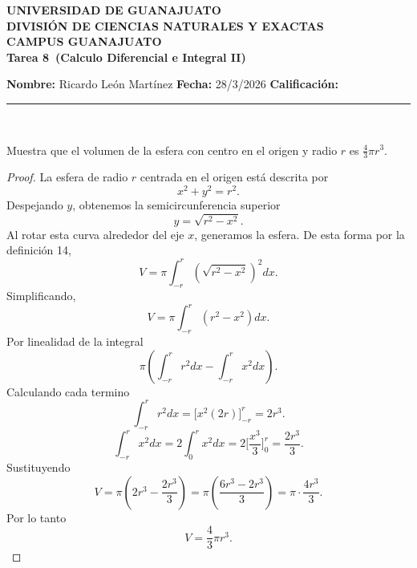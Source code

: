 \documentclass[12pt,a4paper]{article}
\newcommand{\paren}[1]{\left( #1 \right)}
\newcommand{\alumno}{Ricardo León Martínez}
\newcommand{\materia}{Calculo Diferencial e Integral II}
\newcommand{\tarea}{Tarea 8}
\newcommand{\fecha}{28/3/2026}
\begin{document}
    \begin{center}
    {\large\textbf{UNIVERSIDAD DE GUANAJUATO}}\\[0.3cm]
    {\normalsize\textbf{DIVISIÓN DE CIENCIAS NATURALES Y EXACTAS}}\\
    {\normalsize\textbf{CAMPUS GUANAJUATO}}\\[1cm]

    {\Large\textbf{\tarea\ (\materia)}}\\[1cm]
    \end{center}

    \textbf{Nombre:} \alumno \hfill 
    \textbf{Fecha:} \fecha \hfill 
    \textbf{Calificación:} \rule{3cm}{0.4pt} \\[0.3cm]

    \begin{mdframed}[style=mdbluebox,frametitle={Ejercicio 1}]
        Muestra que el volumen de la esfera con centro en el origen y radio $r$ es $\frac43\pi r^{3}$.
    \end{mdframed}

    \begin{proof}
        La esfera de radio $r$ centrada en el origen está descrita por
        \begin{equation*}
            x^{2}+y^{2}=r^{2}.
        \end{equation*}
        Despejando $y$, obtenemos la semicircunferencia superior
        \begin{equation*}
            y=\sqrt{r^{2}-x^{2}}.
        \end{equation*}
        Al rotar esta curva alrededor del eje $x$, generamos la esfera. De esta forma por la definición 14,
        \begin{equation*}
            V=\pi\int_{-r}^{r}\paren{\sqrt{r^{2}-x^{2}}}^{2}dx.
        \end{equation*}
        Simplificando,
        \begin{equation*}
            V=\pi\int_{-r}^{r}(r^{2}-x^{2})dx.
        \end{equation*}
        Por linealidad de la integral
        \begin{equation*}
            \pi\paren{\int_{-r}^{r}r^{2}dx-\int_{-r}^{r}x^{2}dx}.
        \end{equation*}
        Calculando cada termino
        \begin{equation}
            \int_{-r}^{r}r^{2}dx=\big[x^{2}(2r)\big]_{-r}^{r}=2r^{3}.
        \end{equation}
        \begin{equation}
            \int_{-r}^{r}x^{2}dx=2\int_{0}^{r}x^{2}dx=2\big[\frac{x^{3}}{3}\big]_{0}^{r}=\frac{2r^{3}}{3}.
        \end{equation}
        Sustituyendo
        \begin{equation*}
            V=\pi\paren{2r^{3}-\frac{2r^{3}}{3}}=\pi\paren{\frac{6r^{3}-2r^{3}}{3}}=\pi\cdot\frac{4r^{3}}{3}.
        \end{equation*}
        Por lo tanto
        \begin{equation*}
            V=\frac{4}{3}\pi r^{3}.
        \end{equation*}
    \end{proof}
\end{document}
